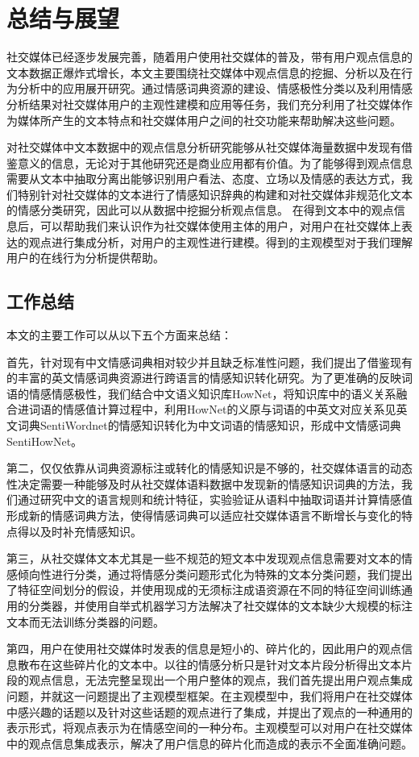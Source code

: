 \chapter{总结与展望}
\label{con}
社交媒体已经逐步发展完善，随着用户使用社交媒体的普及，带有用户观点信息的文本数据正爆炸式增长，本文主要围绕社交媒体中观点信息的挖掘、分析以及在行为分析中的应用展开研究。通过情感词典资源的建设、情感极性分类以及利用情感分析结果对社交媒体用户的主观性建模和应用等任务，我们充分利用了社交媒体作为媒体所产生的文本特点和社交媒体用户之间的社交功能来帮助解决这些问题。

对社交媒体中文本数据中的观点信息分析研究能够从社交媒体海量数据中发现有借鉴意义的信息，无论对于其他研究还是商业应用都有价值。为了能够得到观点信息需要从文本中抽取分离出能够识别用户看法、态度、立场以及情感的表达方式，我们特别针对社交媒体的文本进行了情感知识辞典的构建和对社交媒体非规范化文本的情感分类研究，因此可以从数据中挖掘分析观点信息。
在得到文本中的观点信息后，可以帮助我们来认识作为社交媒体使用主体的用户，对用户在社交媒体上表达的观点进行集成分析，对用户的主观性进行建模。得到的主观模型对于我们理解用户的在线行为分析提供帮助。

\section{工作总结}

本文的主要工作可以从以下五个方面来总结：

首先，针对现有中文情感词典相对较少并且缺乏标准性问题，我们提出了借鉴现有的丰富的英文情感词典资源进行跨语言的情感知识转化研究。为了更准确的反映词语的情感情感极性，我们结合中文语义知识库HowNet，将知识库中的语义关系融合进词语的情感值计算过程中，利用HowNet的义原与词语的中英文对应关系见英文词典SentiWordnet的情感知识转化为中文词语的情感知识，形成中文情感词典SentiHowNet。

第二，仅仅依靠从词典资源标注或转化的情感知识是不够的，社交媒体语言的动态性决定需要一种能够及时从社交媒体语料数据中发现新的情感知识词典的方法，我们通过研究中文的语言规则和统计特征，实验验证从语料中抽取词语并计算情感值形成新的情感词典方法，使得情感词典可以适应社交媒体语言不断增长与变化的特点得以及时补充情感知识。

第三，从社交媒体文本尤其是一些不规范的短文本中发现观点信息需要对文本的情感倾向性进行分类，通过将情感分类问题形式化为特殊的文本分类问题，我们提出了特征空间划分的假设，并使用现成的无须标注成语资源在不同的特征空间训练通用的分类器，并使用自举式机器学习方法解决了社交媒体的文本缺少大规模的标注文本而无法训练分类器的问题。

第四，用户在使用社交媒体时发表的信息是短小的、碎片化的，因此用户的观点信息散布在这些碎片化的文本中。以往的情感分析只是针对文本片段分析得出文本片段的观点信息，无法完整呈现出一个用户整体的观点，我们首先提出用户观点集成问题，并就这一问题提出了主观模型框架。在主观模型中，我们将用户在社交媒体中感兴趣的话题以及针对这些话题的观点进行了集成，并提出了观点的一种通用的表示形式，将观点表示为在情感空间的一种分布。主观模型可以对用户在社交媒体中的观点信息集成表示，解决了用户信息的碎片化而造成的表示不全面准确问题。

